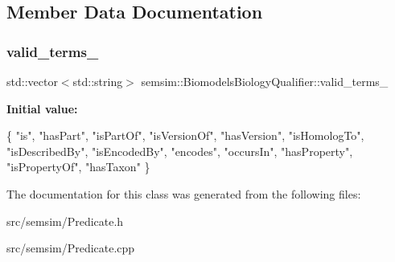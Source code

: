 \subsection{Member Data Documentation}
\mbox{\label{classsemsim_1_1BiomodelsBiologyQualifier_a73a6b7ec962f32c4f03f292f23175440}} 
\subsubsection{\texorpdfstring{valid\+\_\+terms\+\_\+}{valid\_terms\_}}
{\footnotesize\ttfamily std\+::vector$<$std\+::string$>$ semsim\+::\+Biomodels\+Biology\+Qualifier\+::valid\+\_\+terms\+\_\+}

{\bfseries Initial value\+:}
\begin{DoxyCode}
\{
                \textcolor{stringliteral}{"is"},
                \textcolor{stringliteral}{"hasPart"},
                \textcolor{stringliteral}{"isPartOf"},
                \textcolor{stringliteral}{"isVersionOf"},
                \textcolor{stringliteral}{"hasVersion"},
                \textcolor{stringliteral}{"isHomologTo"},
                \textcolor{stringliteral}{"isDescribedBy"},
                \textcolor{stringliteral}{"isEncodedBy"},
                \textcolor{stringliteral}{"encodes"},
                \textcolor{stringliteral}{"occursIn"},
                \textcolor{stringliteral}{"hasProperty"},
                \textcolor{stringliteral}{"isPropertyOf"},
                \textcolor{stringliteral}{"hasTaxon"}
        \}
\end{DoxyCode}


The documentation for this class was generated from the following files\+:\begin{DoxyCompactItemize}
\item 
src/semsim/Predicate.\+h\item 
src/semsim/Predicate.\+cpp\end{DoxyCompactItemize}
